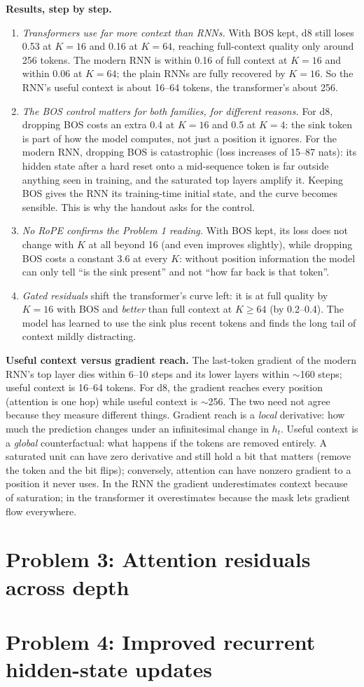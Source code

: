 \documentclass[10pt,letterpaper]{article}
\begin{document}
\textbf{Results, step by step.}
\begin{enumerate}
\item \emph{Transformers use far more context than RNNs.} With BOS kept, d8 still loses 0.53 at $K=16$ and 0.16 at $K=64$, reaching full-context quality only around 256 tokens. The modern RNN is within 0.16 of full context at $K=16$ and within 0.06 at $K=64$; the plain RNNs are fully recovered by $K=16$. So the RNN's useful context is about 16--64 tokens, the transformer's about 256.
\item \emph{The BOS control matters for both families, for different reasons.} For d8, dropping BOS costs an extra 0.4 at $K=16$ and 0.5 at $K=4$: the sink token is part of how the model computes, not just a position it ignores. For the modern RNN, dropping BOS is catastrophic (loss increases of 15--87 nats): its hidden state after a hard reset onto a mid-sequence token is far outside anything seen in training, and the saturated top layers amplify it. Keeping BOS gives the RNN its training-time initial state, and the curve becomes sensible. This is why the handout asks for the control.
\item \emph{No RoPE confirms the Problem 1 reading.} With BOS kept, its loss does not change with $K$ at all beyond 16 (and even improves slightly), while dropping BOS costs a constant 3.6 at every $K$: without position information the model can only tell ``is the sink present'' and not ``how far back is that token''.
\item \emph{Gated residuals} shift the transformer's curve left: it is at full quality by $K=16$ with BOS and \emph{better} than full context at $K\ge64$ (by 0.2--0.4). The model has learned to use the sink plus recent tokens and finds the long tail of context mildly distracting.
\end{enumerate}

\textbf{Useful context versus gradient reach.} The last-token gradient of the modern RNN's top layer dies within 6--10 steps and its lower layers within $\sim$160 steps; useful context is 16--64 tokens. For d8, the gradient reaches every position (attention is one hop) while useful context is $\sim$256. The two need not agree because they measure different things. Gradient reach is a \emph{local} derivative: how much the prediction changes under an infinitesimal change in $h_t$. Useful context is a \emph{global} counterfactual: what happens if the tokens are removed entirely. A saturated unit can have zero derivative and still hold a bit that matters (remove the token and the bit flips); conversely, attention can have nonzero gradient to a position it never uses. In the RNN the gradient underestimates context because of saturation; in the transformer it overestimates because the mask lets gradient flow everywhere.

\section*{Problem 3: Attention residuals across depth}


\section*{Problem 4: Improved recurrent hidden-state updates}

\end{document}
